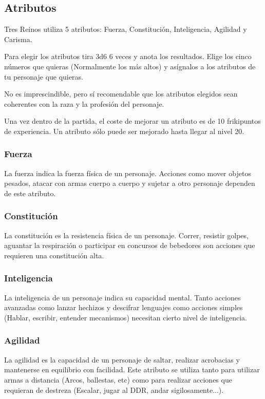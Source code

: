\subsection{Atributos}

Tres Reinos utiliza 5 atributos: Fuerza, Constitución, Inteligencia, Agilidad y Carisma. 
\par
Para elegir los atributos tira 3d6 6 veces y anota los resultados. Elige los cinco números que quieras (Normalmente los más altos) y asígnalos a los atributos de tu personaje que quieras.
\par 
No es imprescindible, pero sí recomendable que los atributos elegidos sean coherentes con la raza y la profesión del personaje.
\par 
Una vez dentro de la partida, el coste de mejorar un atributo es de 10 frikipuntos de experiencia. Un atributo sólo puede ser mejorado hasta llegar al nivel 20.

\subsubsection*{Fuerza}
La fuerza indica la fuerza física de un personaje. Acciones como mover objetos pesados, atacar con armas cuerpo a cuerpo y sujetar a otro personaje dependen de este atributo. 

\subsubsection*{Constitución}
La constitución es la resistencia física de un personaje. Correr, resistir golpes, aguantar la respiración o participar en concursos de bebedores son acciones que requieren una constitución alta. 

\subsubsection*{Inteligencia}
La inteligencia de un personaje indica su capacidad mental. Tanto acciones avanzadas como lanzar hechizos y descifrar lenguajes como acciones simples (Hablar, escribir, entender mecanismos) necesitan cierto nivel de inteligencia.

\subsubsection*{Agilidad}
La agilidad es la capacidad de un personaje de saltar, realizar acrobacias y mantenerse en equilibrio con facilidad. Este atributo se utiliza tanto para utilizar armas a distancia (Arcos, ballestas, etc) como para realizar acciones que requieran de destreza (Escalar, jugar al DDR, andar sigilosamente...).

